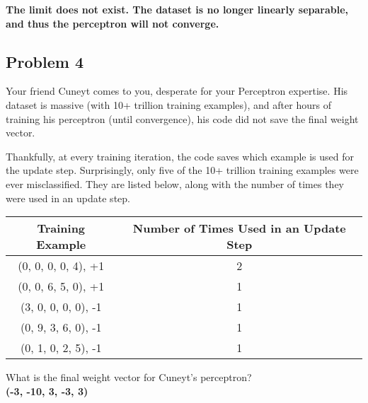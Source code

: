\documentclass[a4paper]{article}
\begin{document}
\textbf{The limit does not exist. The dataset is no longer linearly separable, and thus the perceptron will not converge.}

\subsection*{Problem 4}
Your friend Cuneyt comes to you, desperate for your Perceptron expertise. His dataset is massive (with 10+ trillion training examples), and after hours of training his perceptron (until convergence), his code did not save the final weight vector.

Thankfully, at every training iteration, the code saves which example is used for the update step. Surprisingly, only five of the 10+ trillion training examples were ever misclassified. They are listed below, along with the number of times they were used in an update step.

\begin{center}
\begin{tabular}{ c c }
 Training Example & Number of Times Used in an Update Step \\ 
 \hline
 (0, 0, 0, 0, 4),	+1 & 2  \\
 (0, 0, 6, 5, 0),	+1 & 1  \\
 (3, 0, 0, 0, 0),	-1 & 1  \\
 (0, 9, 3, 6, 0),	-1 & 1  \\ 
 (0, 1, 0, 2, 5),	-1 & 1     
\end{tabular}
\end{center}

What is the final weight vector for Cuneyt's perceptron?\\

\textbf{(-3, -10, 3, -3, 3)}
\end{document}
